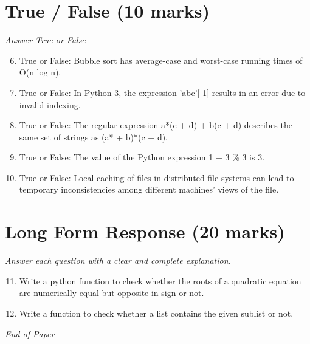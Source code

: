 \documentclass[12pt]{article}
\begin{document}
\section*{True / False (10 marks)}
\textit{Answer True or False}
\begin{enumerate}[label=\arabic*.]
\setcounter{enumi}{5}
\item True or False: Bubble sort has average-case and worst-case running times of O(n log n).
\item True or False: In Python 3, the expression 'abc'[-1] results in an error due to invalid indexing.
\item True or False: The regular expression a*(c + d) + b(c + d) describes the same set of strings as (a* + b)*(c + d).
\item True or False: The value of the Python expression 1 + 3 \% 3 is 3.
\item True or False: Local caching of files in distributed file systems can lead to temporary inconsistencies among different machines' views of the file.
\end{enumerate}

\section*{Long Form Response (20 marks)}
\textit{Answer each question with a clear and complete explanation.}
\begin{enumerate}[label=\arabic*.]
\setcounter{enumi}{10}
\item Write a python function to check whether the roots of a quadratic equation are numerically equal but opposite in sign or not.
\item Write a function to check whether a list contains the given sublist or not.
\end{enumerate}

\vfill
\noindent\textit{End of Paper}
\end{document}
